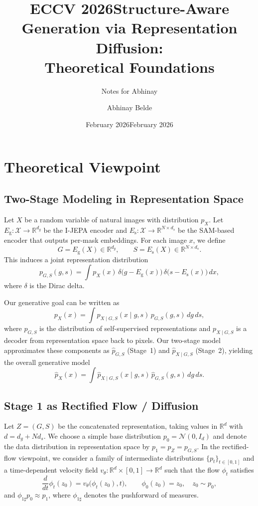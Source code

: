 \documentclass[12pt]{article}
\title{ECCV 2026}
\author{Notes for Abhinay}
\date{February 2026}
\title{Structure-Aware Generation via Representation Diffusion:\\
Theoretical Foundations}
\author{Abhinay Belde}
\date{February 2026}
\begin{document}
\maketitle

\tableofcontents

\section{Theoretical Viewpoint}

\subsection{Two-Stage Modeling in Representation Space}

Let \(X\) be a random variable of natural images with distribution \(p_X\).
Let \(E_{\mathrm{g}} : \mathcal{X} \to \mathbb{R}^{d_g}\) be the I-JEPA encoder and
\(E_{\mathrm{s}} : \mathcal{X} \to \mathbb{R}^{N \times d_s}\) be the SAM-based encoder
that outputs per-mask embeddings. For each image \(x\), we define
\[
G = E_{\mathrm{g}}(X) \in \mathbb{R}^{d_g}, \qquad
S = E_{\mathrm{s}}(X) \in \mathbb{R}^{N \times d_s}.
\]
This induces a joint representation distribution
\[
p_{G,S}(g,s)
= \int p_X(x)\,\delta\big(g - E_{\mathrm{g}}(x)\big)\,\delta\big(s - E_{\mathrm{s}}(x)\big)\,dx,
\]
where \(\delta\) is the Dirac delta.

Our generative goal can be written as
\[
p_X(x)
= \int p_{X \mid G,S}(x \mid g,s)\,p_{G,S}(g,s)\,dg\,ds,
\]
where \(p_{G,S}\) is the distribution of self-supervised representations and
\(p_{X \mid G,S}\) is a decoder from representation space back to pixels.
Our two-stage model approximates these components as
\(\hat{p}_{G,S}\) (Stage~1) and \(\hat{p}_{X \mid G,S}\) (Stage~2),
yielding the overall generative model
\[
\hat{p}_X(x)
= \int \hat{p}_{X \mid G,S}(x \mid g,s)\,\hat{p}_{G,S}(g,s)\,dg\,ds.
\]

\subsection{Stage 1 as Rectified Flow / Diffusion}

Let \(Z = (G,S)\) be the concatenated representation, taking values in
\(\mathbb{R}^d\) with \(d = d_g + N d_s\).
We choose a simple base distribution \(p_0 = \mathcal{N}(0, I_d)\)
and denote the data distribution in representation space by
\(p_1 = p_Z = p_{G,S}\).
In the rectified-flow viewpoint, we consider a family of intermediate
distributions \(\{p_t\}_{t \in [0,1]}\) and a time-dependent
velocity field \(v_\theta : \mathbb{R}^d \times [0,1] \to \mathbb{R}^d\)
such that the flow \(\phi_t\) satisfies
\[
\frac{d}{dt}\phi_t(z_0) = v_\theta\big(\phi_t(z_0), t\big), \qquad
\phi_0(z_0) = z_0, \quad z_0 \sim p_0,
\]
and \(\phi_{1\sharp} p_0 \approx p_1\), where \(\phi_{1\sharp}\) denotes the
pushforward of measures.
\end{document}
